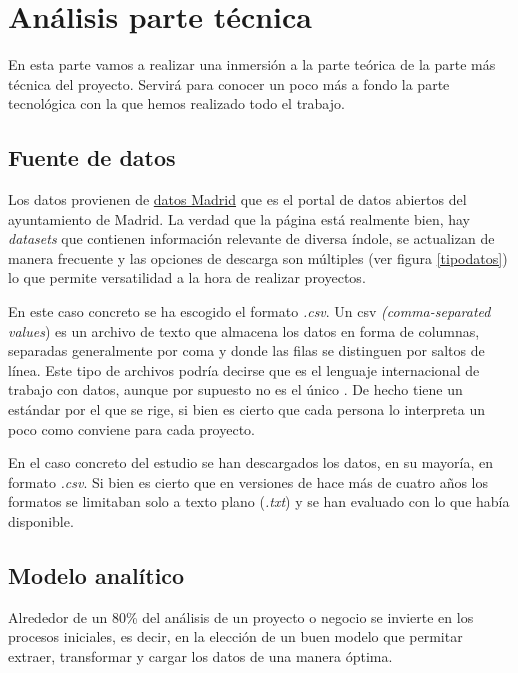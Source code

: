 \section{Análisis parte técnica}\label{teorico-tecnico}

En esta parte vamos a realizar una inmersión a la parte teórica de la parte más técnica del proyecto. Servirá para conocer un poco más a fondo la parte tecnológica con la que hemos realizado todo el trabajo.

\subsection{Fuente de  datos}

Los datos provienen de \href{https://datos.madrid.es}{datos Madrid} que es el portal de datos abiertos del ayuntamiento de Madrid.  La verdad que la página está realmente bien, hay \textit{datasets} que contienen información relevante de diversa índole, se actualizan de manera frecuente y las opciones de descarga son múltiples (ver figura \ref{tipodatos}) lo que permite versatilidad a la hora de realizar proyectos. 


En este caso concreto se ha escogido el formato \textit{.csv}. Un csv \textit{(comma-separated values}) es un archivo de texto que almacena los datos en forma de columnas, separadas generalmente por coma y donde las filas se distinguen por saltos de línea. Este tipo de archivos podría decirse que es el lenguaje internacional de trabajo con datos, aunque por supuesto no es el único \cite{formatos}. De hecho tiene un estándar \cite{estandar} por el que se rige, si bien es cierto que cada persona lo interpreta un poco como conviene para cada proyecto.

En el caso concreto del estudio se han descargados los datos, en su mayoría, en formato \textit{.csv}. Si bien es cierto que en versiones de hace más de cuatro años los formatos se limitaban solo a texto plano (\textit{.txt}) y se han evaluado con lo que había disponible.

\subsection{Modelo analítico}
Alrededor de un 80\% del análisis de un proyecto o negocio se invierte en los procesos iniciales, es decir, en la elección de un buen modelo que permitar extraer, transformar y cargar los datos de una manera óptima. 

